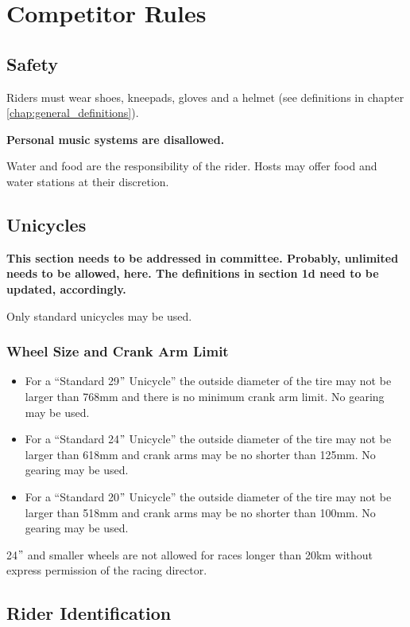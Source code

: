 
\chapter{Competitor Rules}

\section{Safety}
Riders must wear shoes, kneepads, gloves and a helmet (see definitions in chapter \ref{chap:general_definitions}).

\textbf{Personal music systems are disallowed.}

Water and food are the responsibility of the rider. Hosts may offer food and water stations at their discretion.

\section{Unicycles}

\textbf{This section needs to be addressed in committee.  Probably, unlimited needs to be allowed, here.  The definitions in section 1d need to be updated, accordingly.}

Only standard unicycles may be used.
\subsection{Wheel Size and Crank Arm Limit}
\begin{itemize}
\item For a ``Standard 29$"$ Unicycle'' the outside diameter of the tire may not be larger than 768mm and there is no minimum crank arm limit.
No gearing may be used.
\item For a ``Standard 24$"$ Unicycle'' the outside diameter of the tire may not be larger than 618mm and crank arms may be no shorter than 125mm.
No gearing may be used.
\item For a ``Standard 20$"$ Unicycle'' the outside diameter of the tire may not be larger than 518mm and crank arms may be no shorter than 100mm.
No gearing may be used.
\end{itemize}

24$"$ and smaller wheels are not allowed for races longer than 20km without express permission of the racing director.

\section{Rider Identification}

